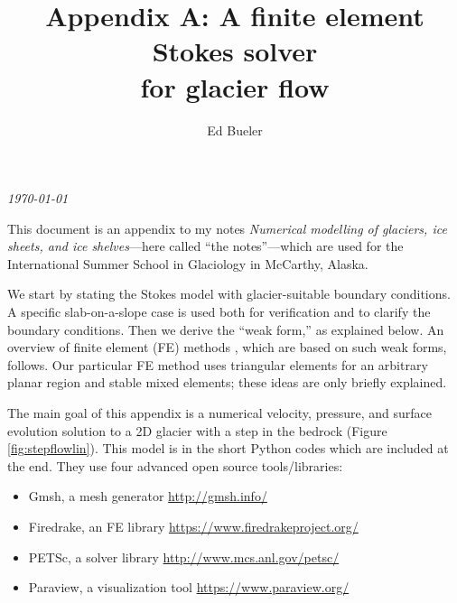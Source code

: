 \documentclass[letterpaper,final,12pt,reqno]{amsart}
\begin{document}
\graphicspath{{figures/}}

\title[Appendix A: A finite element Stokes solver for glacier flow]{Appendix A: A finite element Stokes solver \\ for glacier flow}

\author{Ed Bueler}

\maketitle

\vspace{-8mm}
\begin{center}
\footnotesize
\emph{\today}
\end{center}

\thispagestyle{empty}
\bigskip

\renewcommand{\theequation}{A\arabic{equation}}

This document is an appendix to my notes \emph{Numerical modelling of glaciers, ice sheets, and ice shelves}---here called ``the notes''---which are used for the International Summer School in Glaciology in McCarthy, Alaska.

We start by stating the Stokes model with glacier-suitable boundary conditions.  A specific slab-on-a-slope case is used both for verification and to clarify the boundary conditions.  Then we derive the ``weak form,'' as explained below.  An overview of finite element (FE) methods \cite{Elmanetal2014}, which are based on such weak forms, follows.  Our particular FE method uses triangular elements for an arbitrary planar region and stable mixed elements; these ideas are only briefly explained.

The main goal of this appendix is a numerical velocity, pressure, and surface evolution solution to a 2D glacier with a step in the bedrock (Figure \ref{fig:stepflowlin}).  This model is in the short Python codes which are included at the end.  They use four advanced open source tools/libraries:
\begin{itemize}
\item Gmsh, a mesh generator \hfill \url{http://gmsh.info/}
\item Firedrake, an FE library \hfill \url{https://www.firedrakeproject.org/}
\item PETSc, a solver library \hfill \url{http://www.mcs.anl.gov/petsc/}
\item Paraview, a visualization tool \hfill \url{https://www.paraview.org/}
\end{itemize}
\end{document}
